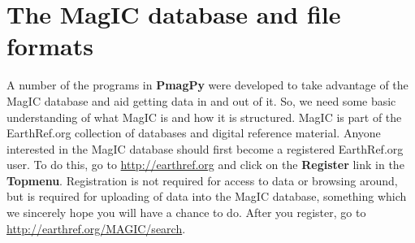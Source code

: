 \documentclass[11pt]{book}
\begin{document}
{{%


\chapter{The MagIC database and file formats}

A number of the programs in {\bf PmagPy} were  developed to take advantage of the MagIC database and aid getting data in and out of it.   So, we need some basic understanding of what MagIC is and how it is structured.
MagIC  is part of the EarthRef.org collection of databases and digital reference material.
Anyone interested in the MagIC database should first become a registered EarthRef.org user.  To do this, go to \url{http://earthref.org} and click on the {\bf Register} link in the {\bf Topmenu}.   Registration is not required for access to data or browsing around, but is required for uploading of data into the MagIC database, something which we sincerely hope you will have a chance to do.
After you register, go to \url{http://earthref.org/MAGIC/search}.


}}
\end{document}
